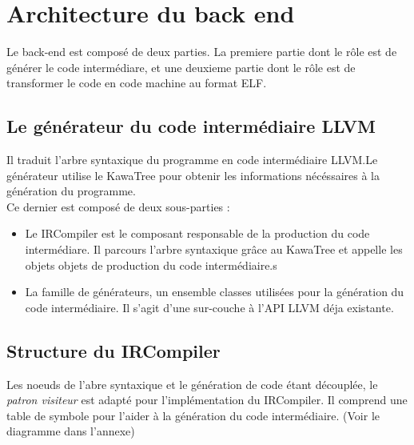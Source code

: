 \documentclass{article}
\begin{document}
\section{Architecture du back end}

Le back-end est composé de deux parties. La premiere partie dont le rôle est de générer le code intermédiare, et une deuxieme partie dont le rôle est de transformer le code en code machine au format ELF. 

\subsection{Le générateur du code intermédiaire LLVM}

Il traduit l'arbre syntaxique du programme en code intermédiaire LLVM.Le générateur utilise le KawaTree pour obtenir les informations nécéssaires à la génération du programme. 
\\
Ce dernier est composé de deux sous-parties :
\begin{itemize}
	\item Le IRCompiler est le composant responsable de la production du code intermédiare. Il parcours l'arbre syntaxique grâce au KawaTree et appelle les objets objets de production du code intermédiaire.s
 	\item La famille de générateurs, un ensemble classes utilisées pour la génération du code intermédiaire. Il s'agit d'une sur-couche à l'API LLVM déja existante.
 \end{itemize}


\subsection{Structure du IRCompiler}

Les noeuds de l'abre syntaxique et le génération de code étant découplée, le \emph{patron visiteur} est adapté pour l'implémentation du IRCompiler. Il comprend une table de symbole pour l'aider à la génération du code intermédiaire. (Voir le diagramme dans l'annexe)\\
\end{document}
